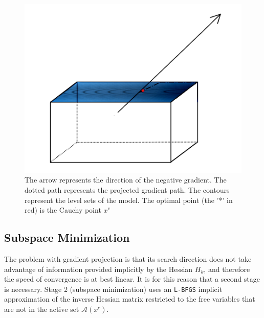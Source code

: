 \begin{figure}
\begin{center}
\includegraphics[scale=0.4]{Figures/cajapresentation3.png}
\caption[Graphical Representation of Gradient Projection]{The arrow represents the direction of the negative gradient. The dotted path represents the projected gradient path. The contours represent the level sets of the model. The optimal point (the '*' in red) is the Cauchy point $x^c$}
\label{caja}
\end{center}
\end{figure}

\subsection{Subspace Minimization}

The problem with gradient projection is that its search direction does not take advantage of information provided implicitly by the Hessian $H_k$, and therefore the speed of convergence is at best linear. It is for this reason that a second stage is necessary. Stage 2 (subspace minimization) uses an \texttt{L-BFGS} implicit approximation of the inverse Hessian matrix restricted to the free variables that are not in the active set $\mathcal{A}(x^c)$.


